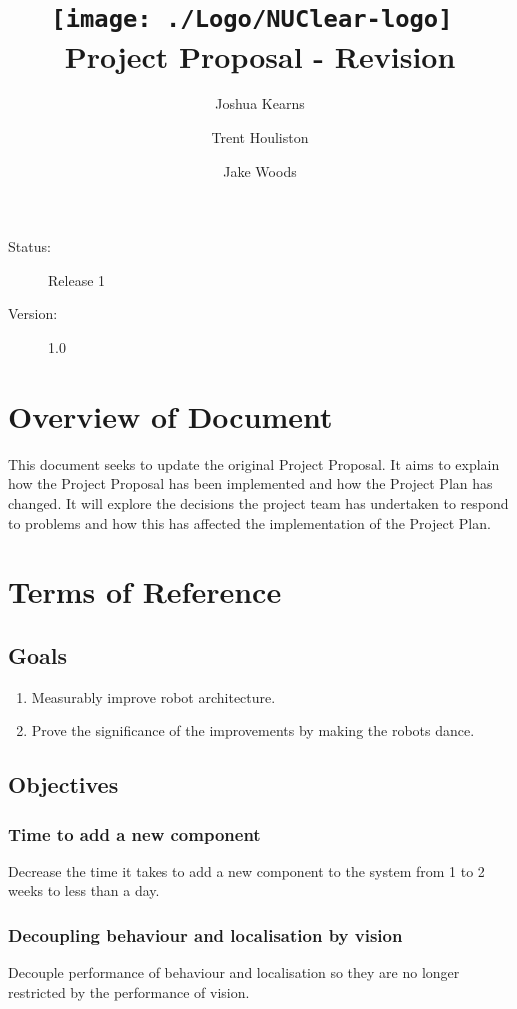 \documentclass[english,12pt]{scrartcl}
\title{\texttt{[image: ./Logo/NUClear-logo]}~\\[1cm] Project Proposal - Revision}
\author{Joshua Kearns \and Trent Houliston \and Jake Woods}
\begin{document}
	\maketitle
	\vfill
	{\large
		\begin{description}
			\item [Status:] Release 1
			\item [Version:] 1.0
		\end{description}}

	\clearpage
	\tableofcontents
	\clearpage

	\section{Overview of Document}
	This document seeks to update the original Project Proposal.
	It aims to explain how the Project Proposal has been implemented and how the Project Plan has changed.
	It will explore the decisions the project team has undertaken to respond to problems and how this has affected the implementation of the Project Plan.

	\section{Terms of Reference}
		\subsection {Goals}
			\begin{enumerate}
				\item Measurably improve robot architecture.
				\item Prove the significance of the improvements by making the robots dance.
			\end{enumerate}
		\subsection {Objectives}
			\subsubsection{Time to add a new component}
				Decrease the time it takes to add a new component to the system from 1 to 2 weeks to less than a day.

			\subsubsection{Decoupling behaviour and localisation by vision}
				Decouple performance of behaviour and localisation so they are no longer restricted by the performance of vision.
\end{document}
